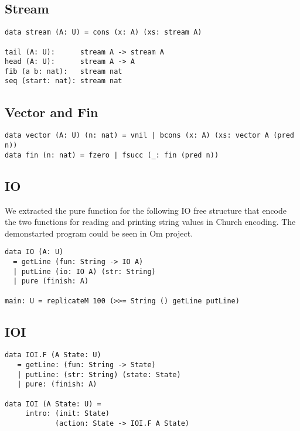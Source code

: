 \documentclass{article}
\begin{document}
\subsection{Stream}

\begin{lstlisting}[mathescape=true]
data stream (A: U) = cons (x: A) (xs: stream A)

tail (A: U):      stream A -> stream A
head (A: U):      stream A -> A
fib (a b: nat):   stream nat
seq (start: nat): stream nat
\end{lstlisting}

\subsection{Vector and Fin}

\begin{lstlisting}[mathescape=true]
data vector (A: U) (n: nat) = vnil | bcons (x: A) (xs: vector A (pred n))
data fin (n: nat) = fzero | fsucc (_: fin (pred n))
\end{lstlisting}

\subsection{IO}

We extracted the pure function for the following IO free structure that
encode the two functions for reading and printing string values in
Church encoding. The demonstarted program could be seen in Om project.

\begin{lstlisting}[mathescape=true]
data IO (A: U)
  = getLine (fun: String -> IO A)
  | putLine (io: IO A) (str: String)
  | pure (finish: A)

main: U = replicateM 100 (>>= String () getLine putLine)
\end{lstlisting}

\subsection{IOI}

\begin{lstlisting}[mathescape=true]
data IOI.F (A State: U)
   = getLine: (fun: String -> State)
   | putLine: (str: String) (state: State)
   | pure: (finish: A)

data IOI (A State: U) =
     intro: (init: State)
            (action: State -> IOI.F A State)
\end{lstlisting}
\end{document}
